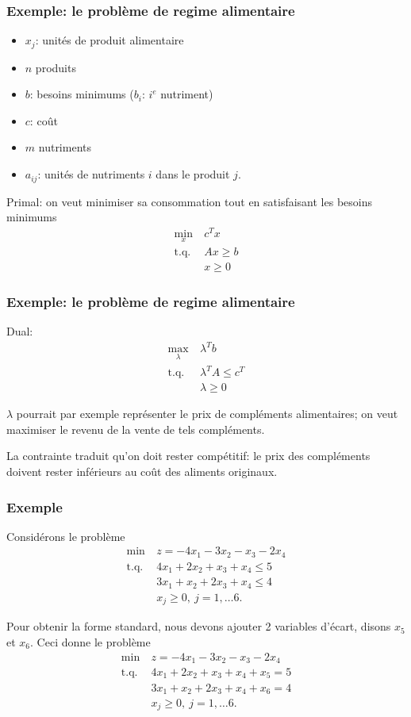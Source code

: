 \documentclass[usepdftitle=false]{beamer}
\begin{document}
\begin{frame}
\frametitle{Exemple: le problème de regime alimentaire}

\begin{itemize}
\item
$x_j$: unités de produit alimentaire
\item
$n$ produits
\item
$b$: besoins minimums ($b_i$: $i^e$ nutriment)
\item
$c$: coût
\item
$m$ nutriments
\item
$a_{ij}$: unités de nutriments $i$ dans le produit $j$.
\end{itemize}

Primal: on veut minimiser sa consommation tout en satisfaisant les besoins minimums
\begin{align*}
\min_x \ & c^T x \\
\mbox{t.q. } & Ax \geq b \\
& x \geq 0
\end{align*}

\end{frame}

\begin{frame}
\frametitle{Exemple: le problème de regime alimentaire}

Dual:
\begin{align*}
\max_{\lambda} \ & \lambda^T b \\
\mbox{t.q. } & \lambda^T A \leq c^T \\
& \lambda \geq 0
\end{align*}

$\lambda$ pourrait par exemple représenter le prix de compléments alimentaires; on veut maximiser le revenu de la vente de tels compléments.

\mbox{}

La contrainte traduit qu'on doit rester compétitif: le prix des compléments doivent rester inférieurs au coût des aliments originaux.

\end{frame}

\begin{frame}
\frametitle{Exemple}

Considérons le problème
\begin{align*}
\min\ &z = -4x_1 - 3x_2 -x_3 -2x_4 \\
\mbox{t.q. } & 4x_1 + 2x_2 + x_3 + x_4 \leq 5 \\
& 3x_1 + x_2 + 2x_3 + x_4 \leq 4 \\
& x_j \geq 0,\ j = 1,\ldots 6.
\end{align*}

Pour obtenir la forme standard, nous devons ajouter 2 variables d'écart, disons $x_5$ et $x_6$. Ceci donne le problème
\begin{align*}
\min\ &z = -4x_1 - 3x_2 -x_3 -2x_4 \\
\mbox{t.q. } & 4x_1 + 2x_2 + x_3 + x_4 + x_5 = 5 \\
& 3x_1 + x_2 + 2x_3 + x_4 + x_6 = 4 \\
& x_j \geq 0,\ j = 1,\ldots 6.
\end{align*}

\end{frame}
\end{document}
